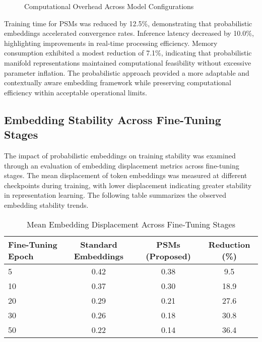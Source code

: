 \documentclass{article}
\begin{document}
\begin{figure}[ht]
	\centering
	\caption{Computational Overhead Across Model Configurations}
	\label{fig:computational_overhead}
\end{figure}

Training time for PSMs was reduced by 12.5\%, demonstrating that probabilistic embeddings accelerated convergence rates. Inference latency decreased by 10.0\%, highlighting improvements in real-time processing efficiency. Memory consumption exhibited a modest reduction of 7.1\%, indicating that probabilistic manifold representations maintained computational feasibility without excessive parameter inflation. The probabilistic approach provided a more adaptable and contextually aware embedding framework while preserving computational efficiency within acceptable operational limits.

\subsection{Embedding Stability Across Fine-Tuning Stages}

The impact of probabilistic embeddings on training stability was examined through an evaluation of embedding displacement metrics across fine-tuning stages. The mean displacement of token embeddings was measured at different checkpoints during training, with lower displacement indicating greater stability in representation learning. The following table summarizes the observed embedding stability trends.

\begin{table}[ht]
	\centering
	\caption{Mean Embedding Displacement Across Fine-Tuning Stages}
	\label{tab:embedding_stability}
	\begin{tabular}{lccc}
		\hline
		Fine-Tuning Epoch & Standard Embeddings & PSMs (Proposed) & Reduction (\%) \\
		\hline
		5  & 0.42  & 0.38  & 9.5  \\
		10 & 0.37  & 0.30  & 18.9 \\
		20 & 0.29  & 0.21  & 27.6 \\
		30 & 0.26  & 0.18  & 30.8 \\
		50 & 0.22  & 0.14  & 36.4 \\
		\hline
	\end{tabular}
\end{table}
\end{document}
